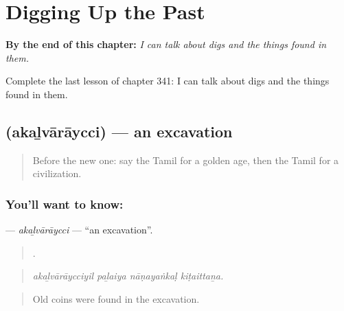 
\chapter{Digging Up the Past}
\label{ch:ta-digging-up-the-past}

\begin{chapteropening}
\textbf{By the end of this chapter:} \emph{I can talk about digs and the things found in them.}

Complete the last lesson of chapter 341: I can talk about digs and the things found in them.
\end{chapteropening}

\section[\texorpdfstring{\ta{அகழ்வாராய்ச்சி} (akaḻvārāycci)}{அகழ்வாராய்ச்சி (akaḻvārāycci)}]{ (akaḻvārāycci) — an excavation}

\label{lesson:TA-C341-akalvaraycci}



\begin{quote}
Before the new one: say the Tamil for a golden age, then the Tamil for a civilization.
\end{quote}

\subsection*{You'll want to know: }
\textbf{} — \emph{akaḻvārāycci} — \textquotedblleft{}an excavation\textquotedblright{}.

\begin{quote}
   .
\end{quote}

\begin{quote}
\emph{akaḻvārāycciyil paḻaiya nāṇayaṅkaḷ kiṭaittaṉa.}
\end{quote}

\begin{quote}
Old coins were found in the excavation.
\end{quote}

